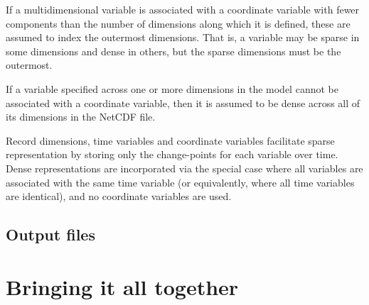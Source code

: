 If a multidimensional variable is associated with a coordinate variable with
fewer components than the number of dimensions along which it is defined,
these are assumed to index the outermost dimensions. That is, a variable may
be sparse in some dimensions and dense in others, but the sparse dimensions
must be the outermost.

If a variable specified across one or more dimensions in the model cannot be
associated with a coordinate variable, then it is assumed to be dense across
all of its dimensions in the NetCDF file.

Record dimensions, time variables and coordinate variables facilitate sparse
representation by storing only the change-points for each variable over
time. Dense representations are incorporated via the special case where all
variables are associated with the same time variable (or equivalently, where
all time variables are identical), and no coordinate variables are used.

\subsection{Output files}

\section{Bringing it all together\label{Bringing_it_all_together}}

